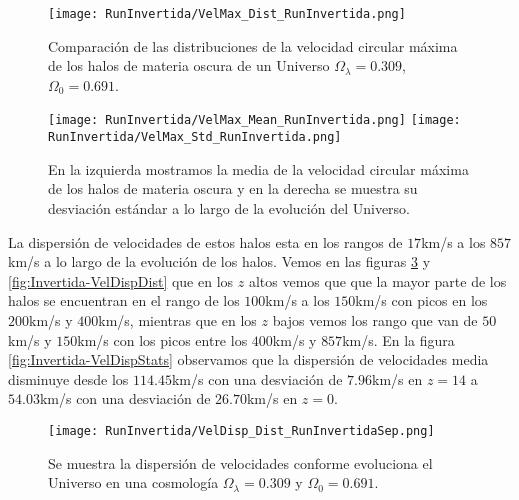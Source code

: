 \begin{figure}[H]
    \centering
    \texttt{[image: RunInvertida/VelMax\_Dist\_RunInvertida.png]}
    \caption[Distribución de la velocidad circular máxima de un Universo $\Omega_\lambda = 0.309 $, $\Omega_0 = 0.691$]{\footnotesize Comparación de las distribuciones de la velocidad circular máxima de los halos de materia oscura de un Universo $\Omega_\lambda = 0.309 $, $\Omega_0 = 0.691$.}
    \label{fig:Invertida-VelMaxDist}
\end{figure}

\begin{figure}[H]
    \centering
    \texttt{[image: RunInvertida/VelMax\_Mean\_RunInvertida.png]}
    \texttt{[image: RunInvertida/VelMax\_Std\_RunInvertida.png]}
    \caption[Media y desviación estándar de la velocidad circular máxima de un Universo $\Omega_\lambda = 0.309 $, $\Omega_0 = 0.691$]{\footnotesize En la izquierda mostramos la media de la velocidad circular máxima de los halos de materia oscura y en la derecha se muestra su desviación estándar a lo largo de la evolución del Universo.}
    \label{fig:Invertida-VelMaxStats}
\end{figure}


La dispersión de velocidades de estos halos esta en los rangos de $17$km/s a los $857$km/s a lo largo de la evolución de los halos. Vemos en las figuras \ref{fig:Invertida-VelDispDistSep} y \ref{fig:Invertida-VelDispDist} que en los $z$ altos vemos que que la mayor parte de los halos se encuentran en el rango de los $100$km/s a los $150$km/s con picos en los $200$km/s y $400$km/s, mientras que en los $z$ bajos vemos los rango que van de $50$km/s y $150$km/s con los picos entre los $400$km/s y $857$km/s. En la figura \ref{fig:Invertida-VelDispStats} observamos que la dispersión de velocidades media disminuye desde los $114.45$km/s con una desviación de $7.96$km/s en $z=14$ a $54.03$km/s con una desviación de $26.70$km/s en $z=0$.


\begin{figure}[H]
    \centering
    \texttt{[image: RunInvertida/VelDisp\_Dist\_RunInvertidaSep.png]}
    \caption[Dispersión de velocidades en la evolución de un Universo $\Omega_\lambda = 0.309 $, $\Omega_0 = 0.691$]{\footnotesize Se muestra la dispersión de velocidades conforme evoluciona el Universo en una cosmología $\Omega_\lambda = 0.309 $ y $\Omega_0 = 0.691$.}
    \label{fig:Invertida-VelDispDistSep}
\end{figure}

